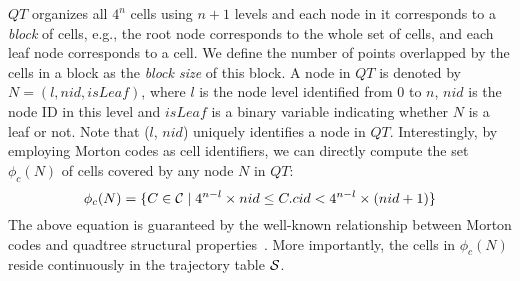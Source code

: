\documentclass[10pt,conference,letterpaper]{IEEEtran}
\newcommand{\allcell}{{\cal C}\xspace}
\newcommand{\trajtable}{{\cal S}\xspace}
\begin{document}
$QT$ organizes all $4^n$ cells using $n+1$ levels and each node in it corresponds to a \emph{block} of cells, e.g., the root node corresponds to the whole set of cells, and each leaf node corresponds to a cell. We define the number of points overlapped by the cells in a block as the \emph{block size} of this block.
A node in $QT$ is denoted by $N=(l, nid, isLeaf)$, where $l$ is the node level identified from $0$ to $n$, $nid$ is the node ID in this level and $isLeaf$ is a binary variable indicating whether $N$ is a leaf or not.
Note that ($l$, $nid$) uniquely identifies a node in $QT$.
Interestingly, by employing Morton codes as cell identifiers, we can directly compute the set $\phi_c(N)$ of cells covered by any node $N$ in $QT$:
\begin{equation}\label{eq:nodetocell}
\small
\phi_c(N) = \{C\in\allcell \mid 4^{n-l}\times nid \leq C.cid < 4^{n-l}\times (nid+1)  \}
\end{equation}
The above equation is guaranteed by the well-known relationship between Morton codes and quadtree structural properties~\cite{morton1966computer}.
More importantly, the cells in $\phi_c(N)$ reside continuously in the trajectory table $\trajtable$.
\end{document}
